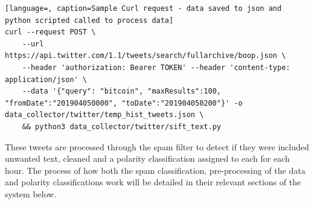 \documentclass[oneside, 12pt]{article}
\begin{document}
			\begin{lstlisting}[language=, caption=Sample Curl request - data saved to json and python scripted called to process data]
curl --request POST \
	--url https://api.twitter.com/1.1/tweets/search/fullarchive/boop.json \
	--header 'authorization: Bearer TOKEN' --header 'content-type: application/json' \
	--data '{"query": "bitcoin", "maxResults":100, "fromDate":"201904050000", "toDate":"201904050200"}' -o data_collector/twitter/temp_hist_tweets.json \
	&& python3 data_collector/twitter/sift_text.py
			\end{lstlisting}
			
			These tweets are processed through the spam filter to detect if they were included unwanted text, cleaned and a polarity classification assigned to each for each hour. The process of how both the spam classification, pre-processing of the data and polarity classifications work will be detailed in their relevant sections of the system below.
			
\end{document}
